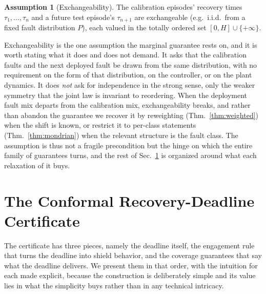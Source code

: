 \documentclass[11pt]{article}
\theoremstyle{plain}
\theoremstyle{definition}
\newtheorem{assumption}{Assumption}
\begin{document}
\begin{assumption}[Exchangeability]
\label{ass:exch}
The calibration episodes' recovery times $\tau_1,\dots,\tau_n$ and a future test episode's
$\tau_{n+1}$ are exchangeable (e.g.\ i.i.d.\ from a fixed fault distribution $P$), each
valued in the totally ordered set $[0,H]\cup\{+\infty\}$.
\end{assumption}

Exchangeability is the one assumption the marginal guarantee rests on, and it is worth
stating what it does and does not demand. It asks that the calibration faults and the next
deployed fault be drawn from the same distribution, with no requirement on the form of that
distribution, on the controller, or on the plant dynamics. It does \emph{not} ask for
independence in the strong sense, only the weaker symmetry that the joint law is invariant to
reordering. When the deployment fault mix departs from the calibration mix, exchangeability
breaks, and rather than abandon the guarantee we recover it by reweighting
(Thm.~\ref{thm:weighted}) when the shift is known, or restrict it to per-class statements
(Thm.~\ref{thm:mondrian}) when the relevant structure is the fault class. The assumption is
thus not a fragile precondition but the hinge on which the entire family of guarantees
turns, and the rest of Sec.~\ref{sec:cert} is organized around what each relaxation of it
buys.

\section{The Conformal Recovery-Deadline Certificate}
\label{sec:cert}
The certificate has three pieces, namely the deadline itself, the engagement rule that turns
the deadline into shield behavior, and the coverage guarantees that say what the deadline
delivers. We present them in that order, with the intuition for each made explicit, because
the construction is deliberately simple and its value lies in what the simplicity buys rather
than in any technical intricacy.
\end{document}
